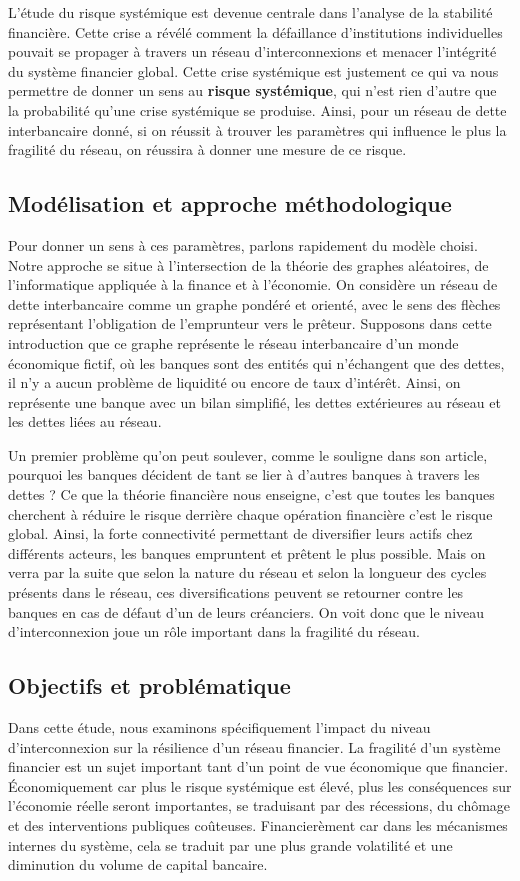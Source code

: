L'étude du risque systémique est devenue centrale dans l'analyse de la stabilité financière.
Cette crise a révélé comment la défaillance d'institutions individuelles pouvait se propager à
travers un réseau d'interconnexions et menacer l'intégrité du système financier global.
Cette crise systémique est justement ce qui va nous permettre de donner un sens au \textbf{risque systémique},
qui n'est rien d'autre que la probabilité qu'une crise systémique se produise.
Ainsi, pour un réseau de dette interbancaire donné,
si on réussit à trouver les paramètres qui influence le plus la fragilité du réseau,
on réussira à donner une mesure de ce risque.


\subsection{Modélisation et approche méthodologique}
Pour donner un sens à ces paramètres, parlons rapidement du modèle choisi.
Notre approche se situe à l'intersection de la théorie des graphes aléatoires,
de l'informatique appliquée à la finance et à l'économie.
On considère un réseau de dette interbancaire comme un graphe pondéré et orienté,
avec le sens des flèches représentant l'obligation de l'emprunteur vers le prêteur.
Supposons dans cette introduction que ce graphe représente le réseau interbancaire d'un monde économique fictif,
où les banques sont des entités qui n'échangent que des dettes,
il n'y a aucun problème de liquidité ou encore de taux d'intérêt.
Ainsi, on représente une banque avec un bilan simplifié, les dettes extérieures au réseau
et les dettes liées au réseau.


Un premier problème qu'on peut soulever, comme \cite{peyton2016contagion} le souligne dans son article,
pourquoi les banques décident de tant se lier à d'autres banques à travers les dettes ?
Ce que la théorie financière nous enseigne, c'est que toutes les banques cherchent à réduire
le risque derrière chaque opération financière c'est le risque global. Ainsi, la forte connectivité permettant de diversifier
leurs actifs chez différents acteurs, les banques empruntent et prêtent le plus possible.
Mais on verra par la suite que selon la nature du réseau et selon la longueur des cycles présents dans le réseau,
ces diversifications peuvent se retourner contre les banques en cas de défaut d'un de leurs créanciers.
On voit donc que le niveau d'interconnexion joue un rôle important dans la fragilité du réseau.


\subsection{Objectifs et problématique}
Dans cette étude, nous examinons spécifiquement l'impact du niveau d'interconnexion sur la résilience d'un réseau
financier. La fragilité d'un système financier est un sujet important tant d'un point de vue économique que financier.
Économiquement car plus le risque systémique est élevé, plus les conséquences sur l'économie réelle seront importantes,
se traduisant par des récessions, du chômage et des interventions publiques coûteuses.
Financierèment car dans les mécanismes internes du système, cela se traduit par une plus grande volatilité
et une diminution du volume de capital bancaire.


